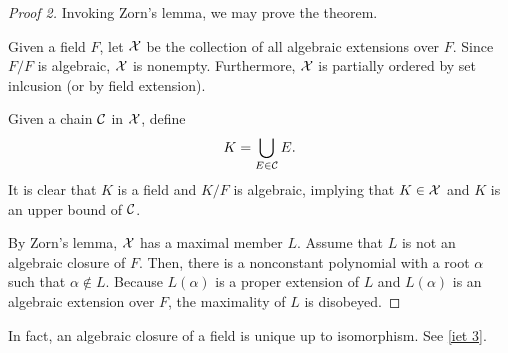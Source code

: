 \begin{proof}[Proof 2]
    Invoking Zorn's lemma, we may prove the theorem.

    Given a field $F$, let ${\mathcal{X}}$ be the collection of all algebraic extensions over $F$.
    Since $F/F$ is algebraic, ${\mathcal{X}}$ is nonempty.
    Furthermore, ${\mathcal{X}}$ is partially ordered by set inlcusion (or by field extension).

    Given a chain ${\mathcal{C}}$ in ${\mathcal{X}}$, define
    \begin{align*}
        K=\bigcup_{E\in{\mathcal{C}}} E.
    \end{align*}
    \color{brown}It is clear that $K$ is a field and $K/F$ is algebraic, implying that $K\in{\mathcal{X}}$ and $K$ is an upper bound of ${\mathcal{C}}$. \color{black}

    By Zorn's lemma, ${\mathcal{X}}$ has a maximal member $L$.
    Assume that $L$ is not an algebraic closure of $F$.
    Then, there is a nonconstant polynomial with a root $\alpha$ such that $\alpha\notin L$.
    Because $L(\alpha)$ is a proper extension of $L$ and $L(\alpha)$ is an algebraic extension over $F$, the maximality of $L$ is disobeyed.
\end{proof}

In fact, an algebraic closure of a field is unique up to isomorphism.
See \cref{iet 3}.